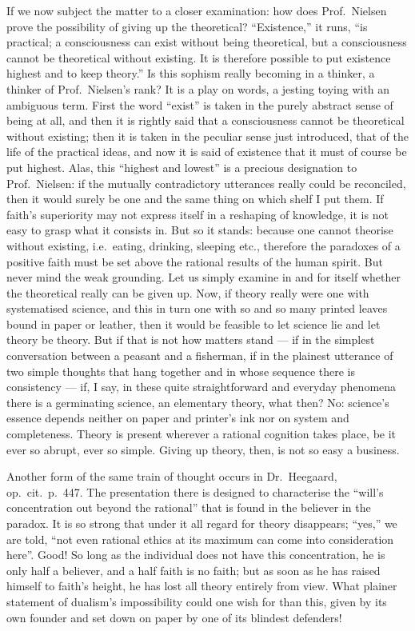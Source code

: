 \documentclass[12pt,a4paper]{book}
\newcommand{\opage}[1]{\marginnote{\footnotesize\textit{[#1]}}}
\begin{document}
If we now subject the matter to a closer examination: how does Prof.\ Nielsen
prove the possibility of giving up the theoretical? ``Existence,'' it runs,
``is practical; a consciousness can exist without being theoretical, but a
consciousness cannot be theoretical without existing. It is therefore possible
to put existence highest and to keep theory.'' Is this sophism really becoming
in a thinker, a thinker
\opage{68}of Prof.\ Nielsen's rank? It is a play on words, a jesting toying
with an ambiguous term. First the word ``exist'' is taken in the purely
abstract sense of being at all, and then it is rightly said that a
consciousness cannot be theoretical without existing; then it is taken in the
peculiar sense just introduced, that of the life of the practical ideas, and
now it is said of existence that it must of course be put highest. Alas, this
``highest and lowest'' is a precious designation to Prof.\ Nielsen: if the
mutually contradictory utterances really could be reconciled, then it would
surely be one and the same thing on which shelf I put them. If faith's
superiority may not express itself in a reshaping of knowledge, it is not easy
to grasp what it consists in. But so it stands: because one cannot theorise
without existing, i.e.\ eating, drinking, sleeping etc., therefore the
paradoxes of a positive faith must be set above the rational results of the
human spirit. But never mind the weak grounding. Let us simply examine in and
for itself whether the theoretical really can be given up. Now, if theory
really were one with systematised science, and this in turn one with so and so
many printed leaves bound in paper or leather, then it would be feasible to let
science lie and let theory be theory. But if that is not how matters stand ---
if in the simplest conversation between a peasant and a fisherman, if in the
plainest utterance of two simple thoughts that hang together and in whose
\opage{69}sequence there is consistency --- if, I say, in these quite
straightforward and everyday phenomena there is a germinating science, an
elementary theory, what then? No: science's essence depends neither on paper
and printer's ink nor on system and completeness. Theory is present wherever a
rational cognition takes place, be it ever so abrupt, ever so simple. Giving up
theory, then, is not so easy a business.

Another form of the same train of thought occurs in Dr.\ Heegaard, op.\ cit.\
p.\ 447. The presentation there is designed to characterise the ``will's
concentration out beyond the rational'' that is found in the believer in the
paradox. It is so strong that under it all regard for theory disappears; ``yes,''
we are told, ``not even rational ethics at its maximum can come into
consideration here''. Good! So long as the individual does not have this
concentration, he is only half a believer, and a half faith is no faith; but as
soon as he has raised himself to faith's height, he has lost all theory
entirely from view. What plainer statement of dualism's impossibility could one
wish for than this, given by its own founder and set down on paper by one of
its blindest defenders!
\end{document}

